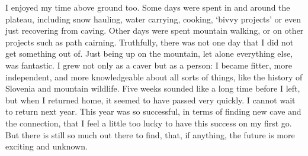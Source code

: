 I enjoyed my time above ground too. Some days were spent in and around the plateau, including snow hauling, water carrying, cooking, ‘bivvy projects’ or even just recovering from caving. Other days were spent mountain walking, or on other projects such as path cairning. Truthfully, there was not one day that I did not get something out of. Just being up on the mountain, let alone everything else, was fantastic. I grew not only as a caver but as a person: I became fitter, more independent, and more knowledgeable about all sorts of things, like the history of Slovenia and mountain wildlife. Five weeks sounded like a long time before I left, but when I returned home, it seemed to have passed very quickly. I cannot wait to return next year. This year was so successful, in terms of finding new cave and the connection, that I feel a little too lucky to have this success on my first go. But there is still so much out there to find, that, if anything, the future is more exciting and unknown.


